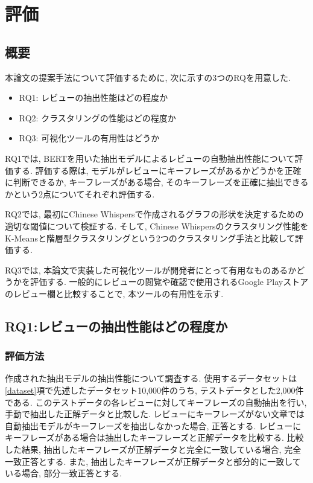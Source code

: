 \chapter{評価}
\label{chap:kekkahyouka}

\section{概要}
本論文の提案手法について評価するために, 次に示すの3つのRQを用意した. 

\begin{itemize}
  \item RQ1: レビューの抽出性能はどの程度か
  \item RQ2: クラスタリングの性能はどの程度か
  \item RQ3: 可視化ツールの有用性はどうか
\end{itemize}

RQ1では, BERTを用いた抽出モデルによるレビューの自動抽出性能について評価する. 評価する際は, モデルがレビューにキーフレーズがあるかどうかを正確に判断できるか, キーフレーズがある場合, そのキーフレーズを正確に抽出できるかという2点についてそれぞれ評価する. 

RQ2では, 最初にChinese Whispersで作成されるグラフの形状を決定するための適切な閾値について検証する. そして, Chinese Whispersのクラスタリング性能をK-Meansと階層型クラスタリングという2つのクラスタリング手法と比較して評価する. 

RQ3では, 本論文で実装した可視化ツールが開発者にとって有用なものあるかどうかを評価する. 一般的にレビューの閲覧や確認で使用されるGoogle Playストアのレビュー欄と比較することで, 本ツールの有用性を示す. 

\section{RQ1:レビューの抽出性能はどの程度か}
\subsection{評価方法}\label{method}
作成された抽出モデルの抽出性能について調査する. 使用するデータセットは\ref{dataset}項で先述したデータセット10,000件のうち, テストデータとした2,000件である. このテストデータの各レビューに対してキーフレーズの自動抽出を行い, 手動で抽出した正解データと比較した. 
レビューにキーフレーズがない文章では自動抽出モデルがキーフレーズを抽出しなかった場合, 正答とする. レビューにキーフレーズがある場合は抽出したキーフレーズと正解データを比較する. 
比較した結果, 抽出したキーフレーズが正解データと完全に一致している場合, 完全一致正答とする. また, 抽出したキーフレーズが正解データと部分的に一致している場合, 部分一致正答とする. 

